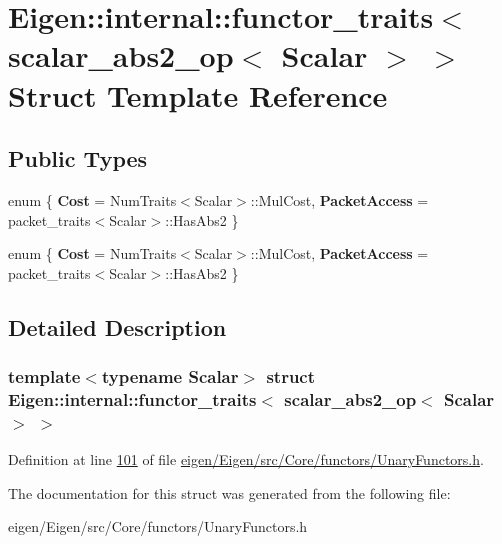 \hypertarget{struct_eigen_1_1internal_1_1functor__traits_3_01scalar__abs2__op_3_01_scalar_01_4_01_4}{}\section{Eigen\+:\+:internal\+:\+:functor\+\_\+traits$<$ scalar\+\_\+abs2\+\_\+op$<$ Scalar $>$ $>$ Struct Template Reference}
\label{struct_eigen_1_1internal_1_1functor__traits_3_01scalar__abs2__op_3_01_scalar_01_4_01_4}
\subsection*{Public Types}
\begin{DoxyCompactItemize}
\item 
\mbox{\label{struct_eigen_1_1internal_1_1functor__traits_3_01scalar__abs2__op_3_01_scalar_01_4_01_4_a65897acdeb463fd15f2d79db97507d9a}} 
enum \{ {\bfseries Cost} = Num\+Traits$<$Scalar$>$\+:\+:Mul\+Cost, 
{\bfseries Packet\+Access} = packet\+\_\+traits$<$Scalar$>$\+:\+:Has\+Abs2
 \}
\item 
\mbox{\label{struct_eigen_1_1internal_1_1functor__traits_3_01scalar__abs2__op_3_01_scalar_01_4_01_4_a7dffcf28e0e15192b424280f5162b5c4}} 
enum \{ {\bfseries Cost} = Num\+Traits$<$Scalar$>$\+:\+:Mul\+Cost, 
{\bfseries Packet\+Access} = packet\+\_\+traits$<$Scalar$>$\+:\+:Has\+Abs2
 \}
\end{DoxyCompactItemize}


\subsection{Detailed Description}
\subsubsection*{template$<$typename Scalar$>$\newline
struct Eigen\+::internal\+::functor\+\_\+traits$<$ scalar\+\_\+abs2\+\_\+op$<$ Scalar $>$ $>$}



Definition at line \hyperlink{eigen_2_eigen_2src_2_core_2functors_2_unary_functors_8h_source_l00101}{101} of file \hyperlink{eigen_2_eigen_2src_2_core_2functors_2_unary_functors_8h_source}{eigen/\+Eigen/src/\+Core/functors/\+Unary\+Functors.\+h}.



The documentation for this struct was generated from the following file\+:\begin{DoxyCompactItemize}
\item 
eigen/\+Eigen/src/\+Core/functors/\+Unary\+Functors.\+h\end{DoxyCompactItemize}
